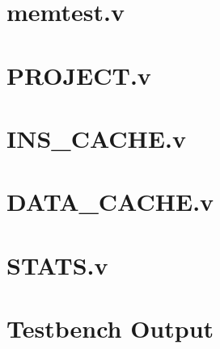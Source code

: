 \documentclass{article}
\begin{document}
\newenvironment{frcseries}{\fontfamily{frc}\selectfont}{}
\newcommand{\textfrc}[1]{{\frcseries#1}}
\newcommand{\mathfrc}[1]{\text{\textfrc{#1}}}

\section{memtest.v}

\newpage 

\section{PROJECT.v}

\newpage 

\section{INS\_CACHE.v}

\newpage 

\section{DATA\_CACHE.v}

\newpage 

\section{STATS.v}

\newpage 

\newpage 
\section{Testbench Output}


\end{document}
